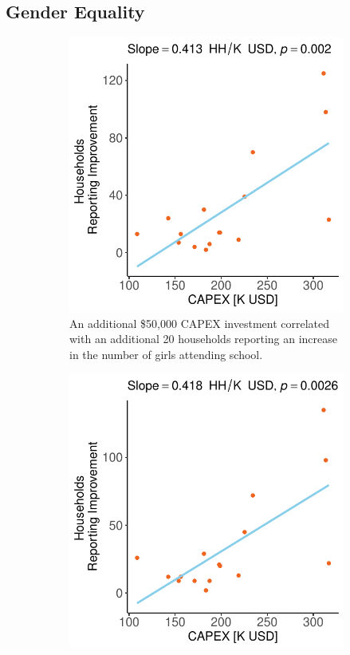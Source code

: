 \subsection{Gender Equality}
\begin{figure}[b]
    \centering
    \begin{subfigure}[t]{0.48\textwidth}
        \centering
        \includegraphics[width=\textwidth]{images/girls_schooling_change_regression_community.pdf}
        \caption{An additional \$50,000 CAPEX investment correlated with an additional 20 households reporting an increase in the number of girls attending school.}
        \label{fig:girls-school}
    \end{subfigure}
    \hfill
    \begin{subfigure}[t]{0.48\textwidth}
        \centering
        \includegraphics[width=\textwidth]{images/boys_schooling_change_regression_community.pdf}

\end{subfigure}
\end{figure}
